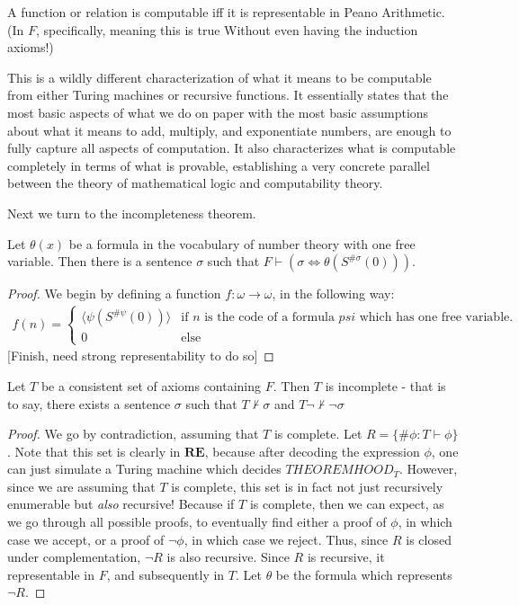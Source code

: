 \begin{theorem}
    A function or relation is computable iff it is representable in Peano Arithmetic. (In $F$, specifically, meaning this is true Without even having the induction axioms!)
\end{theorem}
This is a wildly different characterization of what it means to be computable from either Turing machines or recursive functions. It essentially states that the most basic aspects of what we do on paper with the most basic assumptions about what it means to add, multiply, and exponentiate numbers, are enough to fully capture all aspects of computation. It also characterizes what is computable completely in terms of what is provable, establishing a very concrete parallel between the theory of mathematical logic and computability theory. 
\par Next we turn to the incompleteness theorem. 
\begin{lemma}
    Let $\theta(x)$ be a formula in the vocabulary of number theory with one free variable. Then there is a sentence $\sigma$ such that $F \vdash (\sigma \iff \theta(S^{\#\sigma}(0)))$. 
\end{lemma}
\begin{proof}
    We begin by defining a function $f: \omega \to \omega$, in the following way:
    \begin{align}
        f(n) = \begin{cases}
                   \langle \psi(S^{\#\psi}(0)) \rangle & \textrm{if $n$ is the code of a formula $psi$ which has one free variable.} \\
                   0 & \textrm{else}
        \end{cases}
    \end{align}
    [Finish, need strong representability to do so]
\end{proof}
\begin{theorem}
    Let $T$ be a consistent set of axioms containing $F$. Then $T$ is incomplete - that is to say, there exists a sentence $\sigma$ such that $T \nvdash \sigma$ and $T \neg \nvdash \neg \sigma$
\end{theorem}
\begin{proof}
    We go by contradiction, assuming that $T$ is complete. Let $R = \{\# \phi: T \vdash \phi\}$. Note that this set is clearly in $\textbf{RE}$, because after decoding the expression $\phi$, one can just simulate a Turing machine which decides $THEOREMHOOD_T$. However, since we are assuming that $T$ is complete, this set is in fact not just recursively enumerable but \textit{also} recursive! Because if $T$ is complete, then we can expect, as we go through all possible proofs, to eventually find either a proof of $\phi$, in which case we accept, or a proof of $\neg \phi$, in which case we reject. Thus, since $R$ is closed under complementation, $\neg R$ is also recursive. 
    Since $R$ is recursive, it representable in $F$, and subsequently in $T$. Let $\theta$ be the formula which represents $\neg R$.
\end{proof}

